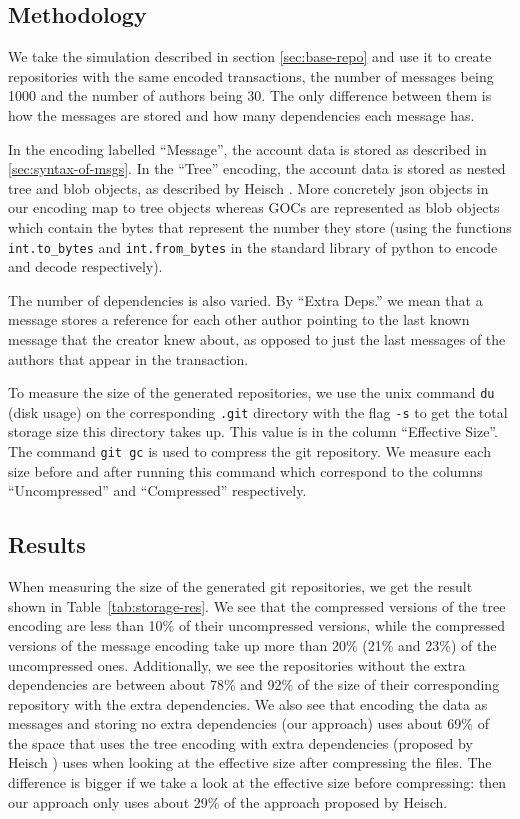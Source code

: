 \subsection{Methodology}
We take the simulation described in section \ref{sec:base-repo} and use it to create repositories with the same encoded transactions, the number of messages being 1000 and the number of authors being 30. The only difference between them is how the messages are stored and how many dependencies each message has.

In the encoding labelled ``Message'', the account data is stored as described in \ref{sec:syntax-of-msgs}. In the ``Tree'' encoding, the account data is stored as nested tree and blob objects, as described by Heisch \cite{delta-goc-ledger-heisch}. More concretely json objects in our encoding map to tree objects whereas GOCs are represented as blob objects which contain the bytes that represent the number they store (using the functions \verb|int.to_bytes| and \verb|int.from_bytes| in the standard library of python to encode and decode respectively).

The number of dependencies is also varied. By ``Extra Deps.'' we mean that a message stores a reference for each other author pointing to the last known message that the creator knew about, as opposed to just the last messages of the authors that appear in the transaction.

To measure the size of the generated repositories, we use the unix command \texttt{du} (disk usage) on the corresponding \texttt{.git} directory with the flag \texttt{-s} to get the total storage size this directory takes up. This value is in the column ``Effective Size''. The command \texttt{git gc} is used to compress the git repository. We measure each size before and after running this command which correspond to the columns ``Uncompressed'' and ``Compressed'' respectively.

\subsection{Results}
When measuring the size of the generated git repositories, we get the result shown in Table~\ref{tab:storage-res}.
We see that the compressed versions of the tree encoding are less than 10\% of their uncompressed versions, while the compressed versions of the message encoding take up more than 20\% (21\% and 23\%) of the uncompressed ones.
Additionally, we see the repositories without the extra dependencies are between about 78\% and 92\% of the size of their corresponding repository with the extra dependencies.
We also see that encoding the data as messages and storing no extra dependencies (our approach) uses about 69\% of the space that uses the tree encoding with extra dependencies (proposed by Heisch \cite{delta-goc-ledger-heisch}) uses when looking at the effective size after compressing the files. The difference is bigger if we take a look at the effective size before compressing: then our approach only uses about 29\% of the approach proposed by Heisch.

